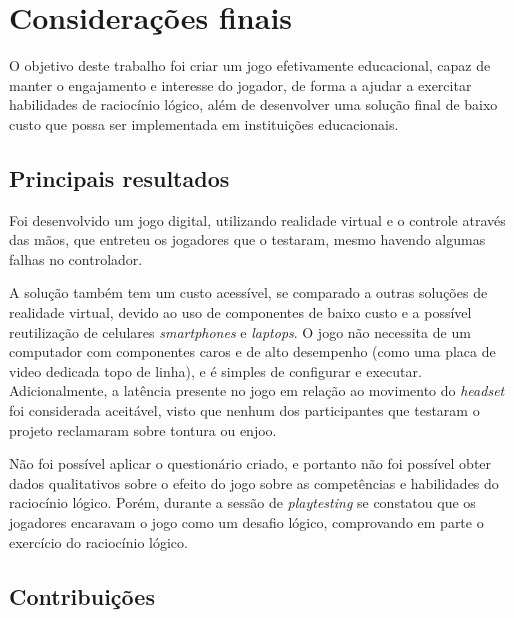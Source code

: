 
\chapter{Considerações finais}\label{cap-consideracoes-finais}

O objetivo deste trabalho foi criar um jogo efetivamente educacional, capaz de manter o engajamento e interesse do jogador, de forma a ajudar a exercitar habilidades de raciocínio lógico, além de desenvolver uma solução final de baixo custo que possa ser implementada em instituições educacionais.

\section{Principais resultados}\label{sec-conc-resultados}

Foi desenvolvido um jogo digital, utilizando realidade virtual 
e o controle através das mãos, que entreteu os jogadores que o 
testaram, mesmo havendo algumas falhas no controlador. 

A solução também tem um custo acessível, se comparado a outras soluções 
de realidade virtual, devido ao uso de componentes de baixo custo e a 
possível reutilização de celulares \textit{smartphones} e \textit{laptops}. 
O jogo não necessita de um computador com 
componentes caros e de alto desempenho (como uma placa de video dedicada 
topo de linha), e é simples de configurar e executar.
Adicionalmente, a latência presente no jogo em relação ao movimento 
do \textit{headset} foi considerada aceitável, visto que nenhum 
dos participantes que testaram o projeto reclamaram sobre tontura 
ou enjoo.

Não foi possível aplicar o questionário criado, e portanto não foi 
possível obter dados qualitativos sobre o efeito do jogo sobre as 
competências e habilidades do raciocínio lógico. Porém, durante a 
sessão de \textit{playtesting} se constatou que os jogadores 
encaravam o jogo como um desafio lógico, comprovando em parte o 
exercício do raciocínio lógico.

\section{Contribuições}\label{sec-conc-contribuicoes}

